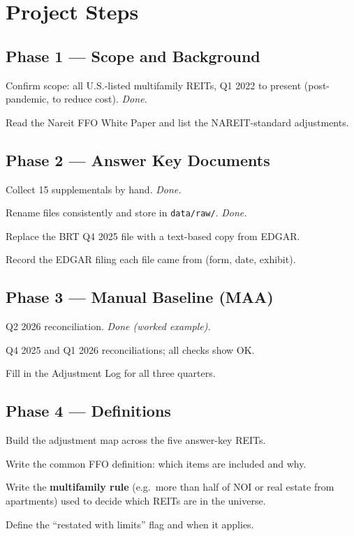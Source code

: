 \documentclass[11pt]{article}
\begin{document}
\section{Project Steps}

\subsection{Phase 1 --- Scope and Background}
\begin{todo}
  \item Confirm scope: all U.S.-listed multifamily REITs, Q1 2022 to present (post-pandemic, to reduce cost). \textit{Done.}
  \item Read the Nareit FFO White Paper and list the NAREIT-standard adjustments.
\end{todo}

\subsection{Phase 2 --- Answer Key Documents}
\begin{todo}
  \item Collect 15 supplementals by hand. \textit{Done.}
  \item Rename files consistently and store in \texttt{data/raw/}. \textit{Done.}
  \item Replace the BRT Q4 2025 file with a text-based copy from EDGAR.
  \item Record the EDGAR filing each file came from (form, date, exhibit).
\end{todo}

\subsection{Phase 3 --- Manual Baseline (MAA)}
\begin{todo}
  \item Q2 2026 reconciliation. \textit{Done (worked example).}
  \item Q4 2025 and Q1 2026 reconciliations; all checks show OK.
  \item Fill in the Adjustment Log for all three quarters.
\end{todo}

\subsection{Phase 4 --- Definitions}
\begin{todo}
  \item Build the adjustment map across the five answer-key REITs.
  \item Write the common FFO definition: which items are included and why.
  \item Write the \textbf{multifamily rule} (e.g.\ more than half of NOI or
        real estate from apartments) used to decide which REITs are in the universe.
  \item Define the ``restated with limits'' flag and when it applies.
\end{todo}
\end{document}
